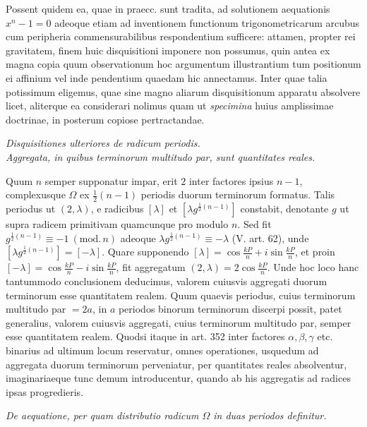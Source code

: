 Possent quidem ea, quae in praecc. sunt tradita, ad solutionem aequationis \(x^n-1=0\) adeoque etiam ad inventionem functionum trigonometricarum arcubus cum peripheria commensurabilibus respondentium sufficere: attamen, propter rei gravitatem, finem huic disquisitioni imponere non possumus, quin antea ex magna copia quum observationum hoc argumentum illustrantium tum positionum ei affinium vel inde pendentium quaedam hic annectamus. Inter quae talia potissimum eligemus, quae sine magno aliarum disquisitionum apparatu absolvere licet, aliterque ea considerari nolimus quam ut \textit{specimina} huius amplissimae doctrinae, in posterum copiose pertractandae.

\begin{center}\itshape Disquisitiones ulteriores de radicum periodis.\\ Aggregata, in quibus terminorum multitudo par, sunt quantitates reales.\end{center}


Quum \(n\) semper supponatur impar, erit \(2\) inter factores ipsius \(n-1\), complexusque \(\Omega\) ex \(\frac12(n-1)\) periodis duorum terminorum formatus. Talis periodus ut \((2,\lambda)\), e radicibus \([\lambda]\) et \([\lambda g^{\frac12(n-1)}]\) constabit, denotante \(g\) ut supra radicem primitivam quamcunque pro modulo \(n\). Sed fit \(g^{\frac12(n-1)}\equiv-1\ (\mathrm{mod.}\,n)\) adeoque \(\lambda g^{\frac12(n-1)}\equiv-\lambda\) (V. art. 62), unde \([\lambda g^{\frac12(n-1)}]=[-\lambda]\). Quare supponendo \([\lambda]=\cos\frac{kP}{n}+i\sin\frac{kP}{n}\), et proin \([-\lambda]=\cos\frac{kP}{n}-i\sin\frac{kP}{n}\), fit aggregatum \((2,\lambda)=2\cos\frac{kP}{n}\). Unde hoc loco hanc tantummodo conclusionem deducimus, valorem cuiusvis aggregati duorum terminorum esse quantitatem realem. Quum quaevis periodus, cuius terminorum multitudo par \(=2a\), in \(a\) periodos binorum terminorum discerpi possit, patet generalius, valorem cuiusvis aggregati,
cuius terminorum multitudo par, semper esse quantitatem realem. Quodsi itaque in art. 352 inter factores \(\alpha,\allowbreak \beta,\allowbreak \gamma\) etc. binarius ad ultimum locum reservatur, omnes operationes, usquedum ad aggregata duorum terminorum perveniatur, per quantitates reales absolventur, imaginariaeque tunc demum introducentur, quando ab his aggregatis ad radices ipsas progredieris.

\begin{center}\itshape De aequatione, per quam distributio radicum \(\Omega\) in duas periodos definitur.\end{center}


